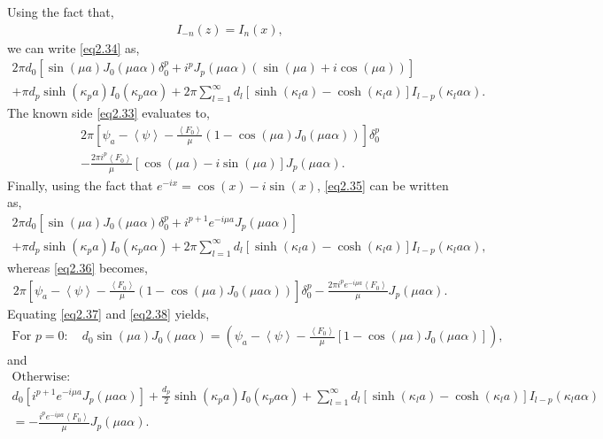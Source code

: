 \documentclass[aip,graphicx]{revtex4-1}
\newcommand{\lr}[1]{\left(#1\right)}
\newcommand{\lrsq}[1]{\left[ #1 \right]}
\newcommand{\lra}[1]{\left\langle #1 \right\rangle}
\newcommand{\besj}[2]{J_{#1}\lr{#2}}
\newcommand{\besi}[2]{I_{#1}\lr{#2}}
\begin{document}
Using the fact that,
    \begin{align}
        \besi{-n}{z}=\besi{n}{x},
    \end{align}
    we can write \eqref{eq2.34} as,
    \begin{multline}
        2\pi d_0\left[\sin\lr{\mu a}\besj{0}{\mu a \alpha}\delta_{0}^{p}+i^p\besj{p}{\mu a \alpha}\lr{\sin\lr{\mu a}+i\cos\lr{\mu a}}\right]\\
        +\pi d_p\sinh\lr{\kappa_p a}\besi{0}{\kappa_p a \alpha}+2\pi\sum_{l=1}^{\infty}d_l\lrsq{\sinh\lr{\kappa_l a}-\cosh\lr{\kappa_l a}}\besi{l-p}{\kappa_l a \alpha}.\label{eq2.35}    
    \end{multline}
The known side \eqref{eq2.33} evaluates to,
        \begin{multline}
        2\pi\lrsq{\psi_a-\lra{\psi}-\frac{\lra{F_0}}{\mu}\lr{1-\cos\lr{\mu a}\besj{0}{\mu a \alpha}}}\delta_{0}^{p}\\
        -\frac{2\pi i^p\lra{F_0}}{\mu}\left[\cos\lr{\mu a}-i\sin\lr{\mu a}\right]\besj{p}{\mu a \alpha}.\label{eq2.36}
        \end{multline}
Finally, using the fact that $e^{-ix}=\cos\lr{x}-i\sin\lr{x}$, \eqref{eq2.35} can be written as,
    \begin{multline}
        2\pi d_0\left[\sin\lr{\mu a}\besj{0}{\mu a \alpha}\delta_{0}^{p}+i^{p+1}e^{-i\mu a}\besj{p}{\mu a \alpha}\right]\\
        +\pi d_p\sinh\lr{\kappa_p a}\besi{0}{\kappa_p a \alpha}+2\pi\sum_{l=1}^{\infty}d_l\lrsq{\sinh\lr{\kappa_l a}-\cosh\lr{\kappa_l a}}\besi{l-p}{\kappa_l a \alpha},\label{eq2.37}    
    \end{multline}
        whereas \eqref{eq2.36} becomes,
        \begin{align}
        2\pi\lrsq{\psi_a-\lra{\psi}-\frac{\lra{F_0}}{\mu}\lr{1-\cos\lr{\mu a}\besj{0}{\mu a \alpha}}}\delta_{0}^{p}-\frac{2\pi i^p e^{-i\mu a}\lra{F_0}}{\mu}\besj{p}{\mu a \alpha}.\label{eq2.38}
        \end{align}
Equating \eqref{eq2.37} and \eqref{eq2.38} yields,
        \begin{multline}
        \text{For }p=0:\quad d_0\sin\lr{\mu a}\besj{0}{\mu a \alpha}= \lr{\psi_a-\lra{\psi}-\frac{\lra{F_0}}{\mu}\lrsq{1-\cos\lr{\mu a}\besj{0}{\mu a \alpha}}}\label{eq2.39},
    \end{multline}
        and
        \begin{multline}
        \text{Otherwise:}\\
        d_0\left[i^{p+1}e^{-i\mu a}\besj{p}{\mu a \alpha}\right]
        +\frac{d_p}{2}\sinh\lr{\kappa_p a}\besi{0}{\kappa_p a \alpha}+\sum_{l=1}^{\infty}d_l\lrsq{\sinh\lr{\kappa_l a}-\cosh\lr{\kappa_l a}}\besi{l-p}{\kappa_l a \alpha}\\
        = -\frac{i^p e^{-i\mu a}\lra{F_0}}{\mu}\besj{p}{\mu a \alpha}.\label{eq2.40}
    \end{multline}
    
\end{document}
